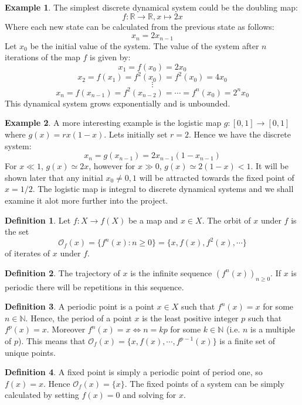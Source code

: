 \documentclass[11pt]{article}
\theoremstyle{definition}
\newtheorem{exmp}{Example}[section]
\newtheorem{definition}{Definition}[section]
\begin{document}
\begin{exmp}
The simplest discrete dynamical system could be the doubling map: \[f : \mathbb{R} \to \mathbb{R}, x \mapsto 2x\] Where each new state can be calculated from the previous state as follows: \[x_n = 2x_{n-1}\] Let $x_0$ be the initial value of the system. The value of the system after $n$ iterations of the map $f$ is given by: \[x_1 = f(x_0) = 2x_0\] \[x_2 = f(x_1) = f^2(x_0) = f^2(x_0) = 4x_0\] \[\vdots\] \[x_n = f(x_{n-1}) = f^2(x_{n-2}) = \cdots = f^n(x_0) = 2^nx_0\] This dynamical system grows exponentially and is unbounded.
\end{exmp}

\begin{exmp}
    A more interesting example is the logistic map $g: [0,1] \to [0,1]$ where $g(x)=rx(1-x)$. Lets initially set $r = 2$. Hence we have the discrete system: \[x_n = g(x_{n-1}) = 2x_{n-1}(1 - x_{n-1})\] For $x \ll 1$, $g(x) \simeq 2x$, however for $x \gg 0$, $g(x) \simeq 2(1-x) < 1$. It will be shown later that any initial $x_0 \neq 0, 1$ will be attracted towards the fixed point of $x = 1/2$. The logistic map is integral to discrete dynamical systems and we shall examine it alot more further into the project.
\end{exmp}

\begin{definition}
    Let $f: X \to f(X)$ be a map and $x \in X$. The orbit of $x$ under $f$ is the set \[\mathcal{O}_f(x) = \lbrace f^n(x) : n \geq 0 \rbrace = \lbrace x, f(x), f^2(x), \cdots \rbrace\] of iterates of $x$ under $f$.
\end{definition}

\begin{definition}
    The trajectory of $x$ is the infinite sequence $(f^n(x))_{n \geq 0}$. If $x$ is periodic there will be repetitions in this sequence.
\end{definition}

\begin{definition}
    A periodic point is a point $x \in X$ such that $f^n(x) = x$ for some $n \in \mathbb{N}$. Hence, the period of a point $x$ is the least positive integer $p$ such that $f^p(x) = x$. Moreover $f^n(x) = x \iff n = kp$ for some $k \in \mathbb{N}$ (i.e. $n$ is a multiple of $p$). This means that $\mathcal{O}_f(x) = \lbrace x, f(x), \cdots, f^{p-1}(x) \rbrace$ is a finite set of unique points.
\end{definition}

\begin{definition}
    A fixed point is simply a periodic point of period one, so $f(x) = x$. Hence $\mathcal{O}_f(x) = \lbrace x \rbrace$. The fixed points of a system can be simply calculated by setting $f(x) = 0$ and solving for $x$.
\end{definition}
\end{document}
